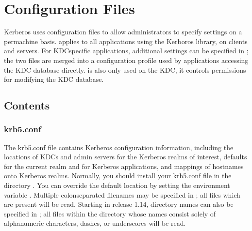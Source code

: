 \documentclass[letterpaper,10pt,english]{sphinxmanual}
\begin{document}
\chapter{Configuration Files}
\label{\detokenize{admin/conf_files/index:configuration-files}}\label{\detokenize{admin/conf_files/index::doc}}
\sphinxAtStartPar
Kerberos uses configuration files to allow administrators to specify
settings on a per\sphinxhyphen{}machine basis.  {\hyperref[\detokenize{admin/conf_files/krb5_conf:krb5-conf-5}]{}} applies to all
applications using the Kerboros library, on clients and servers.
For KDC\sphinxhyphen{}specific applications, additional settings can be specified in
{\hyperref[\detokenize{admin/conf_files/kdc_conf:kdc-conf-5}]{}}; the two files are merged into a configuration profile
used by applications accessing the KDC database directly.  {\hyperref[\detokenize{admin/conf_files/kadm5_acl:kadm5-acl-5}]{}}
is also only used on the KDC, it controls permissions for modifying the
KDC database.


\section{Contents}
\label{\detokenize{admin/conf_files/index:contents}}

\subsection{krb5.conf}
\label{\detokenize{admin/conf_files/krb5_conf:krb5-conf}}\label{\detokenize{admin/conf_files/krb5_conf:krb5-conf-5}}\label{\detokenize{admin/conf_files/krb5_conf::doc}}
\sphinxAtStartPar
The krb5.conf file contains Kerberos configuration information,
including the locations of KDCs and admin servers for the Kerberos
realms of interest, defaults for the current realm and for Kerberos
applications, and mappings of hostnames onto Kerberos realms.
Normally, you should install your krb5.conf file in the directory
.  You can override the default location by setting the
environment variable .  Multiple colon\sphinxhyphen{}separated
filenames may be specified in ; all files which are
present will be read.  Starting in release 1.14, directory names can
also be specified in ; all files within the directory
whose names consist solely of alphanumeric characters, dashes, or
underscores will be read.
\end{document}
